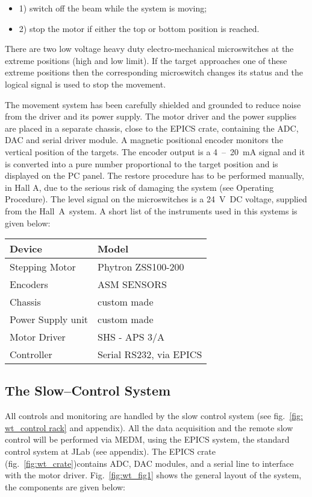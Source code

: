 \begin{itemize}
\item 1) switch off the beam while the system is moving; 
\item 2) stop the motor if either the top or bottom position is reached. 
\end{itemize}
There are two low voltage heavy duty electro-mechanical microswitches
at the extreme positions (high and low limit). If the target approaches
one of these extreme positions then the corresponding microswitch
changes its status and the logical signal is used to stop the movement.

The movement system has been carefully shielded and grounded to reduce
noise from the driver and its power supply. The motor driver and the
power supplies are placed in a separate chassis, close to the EPICS
crate, containing the ADC, DAC and serial driver module. A magnetic
positional encoder monitors the vertical position of the targets.
The encoder output is a 4~--~20~mA signal and it is converted into
a pure number proportional to the target position and is displayed
on the PC panel. The restore procedure has to be performed manually,
in Hall A, due to the serious risk of damaging the system (see Operating
Procedure). The level signal on the microswitches is a 24~V~DC voltage,
supplied from the Hall~A~system. A short list of the instruments
used in this systems is given below: 

\begin{center}\begin{tabular}{ll}
\hline 
Device &
 Model \\
\hline
Stepping Motor &
 Phytron ZSS100-200 \\
 Encoders &
 ASM SENSORS \\
 Chassis &
 custom made \\
 Power Supply unit &
 custom made \\
 Motor Driver &
 SHS - APS 3/A \\
 Controller &
 Serial RS232, via EPICS  \\
\hline
\end{tabular}\end{center}


\subsection{The Slow--Control System}

All controls and monitoring are handled by the slow control system
(see fig.~\ref{fig: wt_control rack} and appendix). All the data acquisition and
the remote slow control will be performed via MEDM, using the EPICS
system, the standard control system at JLab (see appendix). The EPICS
crate (fig.~\ref{fig:wt_crate})contains ADC, DAC modules, and a serial
line to interface with the motor driver. Fig.~\ref{fig:wt_fig1} shows the
general layout of the system, the components are given below:

